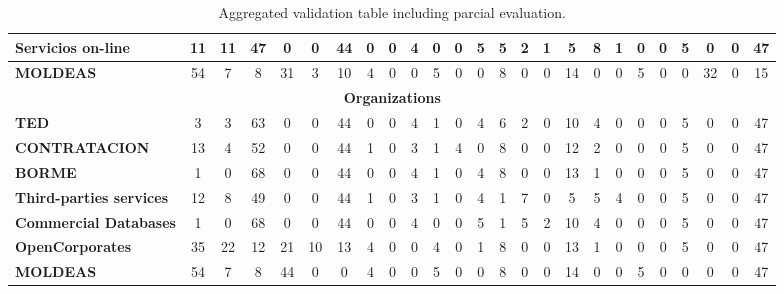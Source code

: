 \begin{table*}[t]
\begin{center}
\begin{tabular}{|p{2cm}||c|c|c||c|c|c||c|c|c||c|c|c||c|c|c||c|c|c||c|c|c||c|c|c|}
 \textbf{Servicios on-line} 	& 11 & 11 & 47 & 0 & 0 & 44 & 0 & 0 & 4 & 0 & 0 & 5 & 5 & 2 & 1 & 5 & 8 & 1 & 0 & 0 & 5 & 0 & 0 & 47 \\ \hline 
 \textbf{MOLDEAS}		& 54 & 7 & 8 & 31 & 3 & 10 & 4 & 0 & 0 & 5 & 0 & 0 & 8 & 0 & 0 & 14 & 0 & 0 & 5 & 0 & 0 & 32 & 0 & 15 \\ \hline 
 \multicolumn{25}{|c|}{\textbf{Organizations}} \\ \hline
 \textbf{TED} 			&  3 & 3 & 63 & 0 & 0 & 44 & 0 & 0 & 4 & 1 & 0 & 4 & 6 & 2 & 0 & 10 & 4 & 0 & 0 & 0 & 5 & 0 & 0 & 47 \\ \hline 
 \textbf{CONTRATACION} &    13 & 4 & 52 & 0 & 0 & 44 & 1 & 0 & 3 & 1 & 4 & 0 & 8 & 0 & 0 & 12 & 2 & 0 & 0 & 0 & 5 & 0 & 0 & 47 \\ \hline 
 \textbf{BORME}			&    1 & 0 & 68 & 0 & 0 & 44 & 0 & 0 & 4 & 1 & 0 & 4 & 8 & 0 & 0 & 13 & 1 & 0 & 0 & 0 & 5 & 0 & 0 & 47 \\ \hline 
 \textbf{Third-parties services} 	&  12 & 8 & 49 & 0 & 0 & 44 & 1 & 0 & 3 & 1 & 0 & 4 & 1 & 7 & 0 & 5 & 5 & 4 & 0 & 0 & 5 & 0 & 0 & 47 \\ \hline 
 \textbf{Commercial Databases} &     1 & 0 & 68 & 0 & 0 & 44 & 0 & 0 & 4 & 0 & 0 & 5 & 1 & 5 & 2 & 10 & 4 & 0 & 0 & 0 & 5 & 0 & 0 & 47 \\ \hline 
 \textbf{OpenCorporates} 	&    35 & 22 & 12 & 21 & 10 & 13 & 4 & 0 & 0 & 4 & 0 & 1 & 8 & 0 & 0 & 13 & 1 & 0 & 0 & 0 & 5 & 0 & 0 & 47 \\ \hline 
 \textbf{MOLDEAS} 		&    54 & 7 & 8 & 44 & 0 & 0 & 4 & 0 & 0 & 5 & 0 & 0 & 8 & 0 & 0 & 14 & 0 & 0 & 5 & 0 & 0 & 0 & 0 & 47 \\ \hline 
\hline
  \end{tabular}
  \caption{Aggregated validation table including parcial evaluation.}
  \label{tabla:agregado-full}
  \end{center}
\end{table*} 


